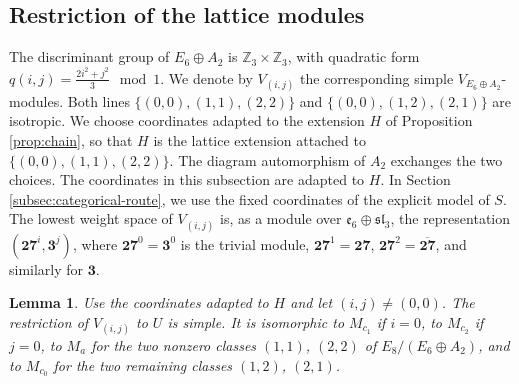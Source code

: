 \documentclass[leqno]{article}
\newcommand{\Z}{\ensuremath{\mathbb{Z}}}
\newtheorem{lemma}[thm]{Lemma}
\numberwithin{equation}{section}
\begin{document}
\subsection{Restriction of the lattice modules}

The discriminant group of $E_6 \oplus A_2$ is $\Z_3 \times \Z_3$, with quadratic form $q(i,j) = \frac{2i^2+j^2}{3} \mod 1$. We denote by $V_{(i,j)}$ the corresponding simple $V_{E_6 \oplus A_2}$-modules. Both lines $\{(0,0),(1,1),(2,2)\}$ and $\{(0,0),(1,2),(2,1)\}$ are isotropic. We choose coordinates adapted to the extension $H$ of Proposition \ref{prop:chain}, so that $H$ is the lattice extension attached to $\{(0,0),(1,1),(2,2)\}$. The diagram automorphism of $A_2$ exchanges the two choices. The coordinates in this subsection are adapted to $H$. In Section \ref{subsec:categorical-route}, we use the fixed coordinates of the explicit model of $S$. The lowest weight space of $V_{(i,j)}$ is, as a module over $\mathfrak e_6 \oplus \mathfrak{sl}_3$, the representation $(\mathbf{27}^{i},\mathbf 3^{j})$, where $\mathbf{27}^{0} = \mathbf 3^0$ is the trivial module, $\mathbf{27}^{1} = \mathbf{27}$, $\mathbf{27}^{2} = \overline{\mathbf{27}}$, and similarly for $\mathbf 3$.

\begin{lemma}
\label{lem:restriction}
Use the coordinates adapted to $H$ and let $(i,j) \neq (0,0)$. The restriction of $V_{(i,j)}$ to $U$ is simple. It is isomorphic to $M_{c_1}$ if $i = 0$, to $M_{c_2}$ if $j = 0$, to $M_a$ for the two nonzero classes $(1,1)$, $(2,2)$ of $E_8/(E_6 \oplus A_2)$, and to $M_{c_0}$ for the two remaining classes $(1,2)$, $(2,1)$.
\end{lemma}
\end{document}
